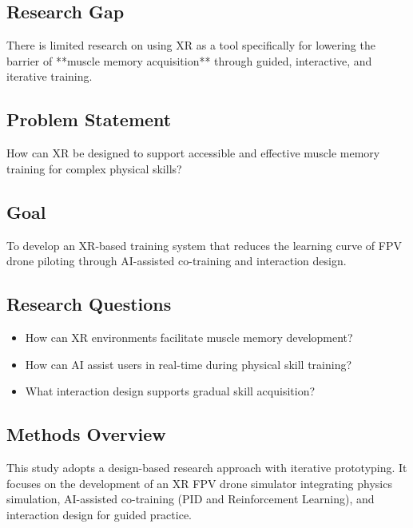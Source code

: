 \subsection{Research Gap}
There is limited research on using XR as a tool specifically for lowering the barrier of **muscle memory acquisition** through guided, interactive, and iterative training.

\subsection{Problem Statement}
How can XR be designed to support accessible and effective muscle memory training for complex physical skills?

\subsection{Goal}
To develop an XR-based training system that reduces the learning curve of FPV drone piloting through AI-assisted co-training and interaction design.

\subsection{Research Questions}
\begin{itemize}
    \item How can XR environments facilitate muscle memory development?
    \item How can AI assist users in real-time during physical skill training?
    \item What interaction design supports gradual skill acquisition?
\end{itemize}

\subsection{Methods Overview}
This study adopts a design-based research approach with iterative prototyping. It focuses on the development of an XR FPV drone simulator integrating physics simulation, AI-assisted co-training (PID and Reinforcement Learning), and interaction design for guided practice.